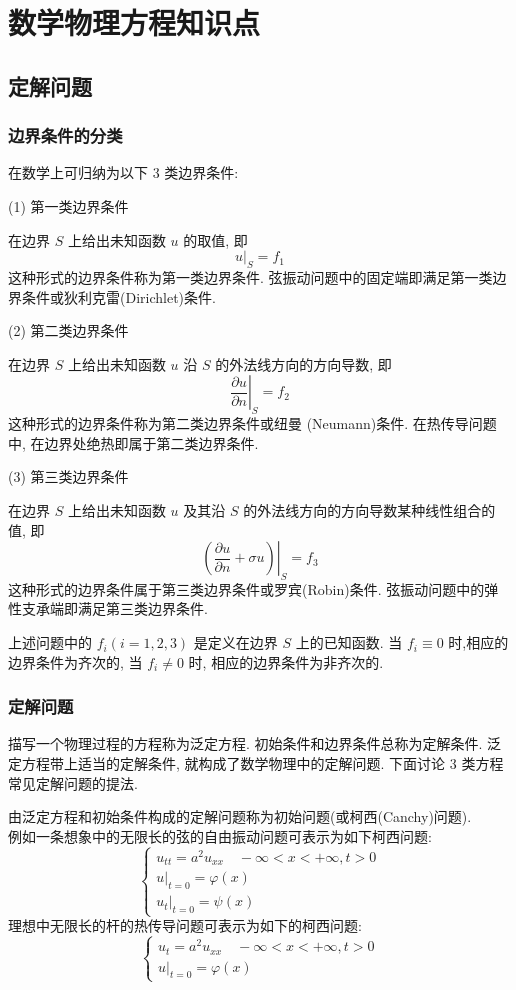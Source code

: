 \section{数学物理方程知识点}

\subsection{定解问题}

\subsubsection{边界条件的分类}
在数学上可归纳为以下 3 类边界条件:

(1) 第一类边界条件

在边界 $S$ 上给出未知函数 $ u $ 的取值, 即
$$
\left.u\right|_{S}=f_{1}
$$
这种形式的边界条件称为第一类边界条件. 弦振动问题中的固定端即满足第一类边界条件或狄利克雷(Dirichlet)条件.

(2) 第二类边界条件

在边界 $ S $ 上给出未知函数 $ u $ 沿 $ S $ 的外法线方向的方向导数, 即
$$
\left.\frac{\partial u}{\partial n}\right|_{S}=f_{2}
$$
这种形式的边界条件称为第二类边界条件或纽曼 (Neumann)条件. 在热传导问题中, 在边界处绝热即属于第二类边界条件.

(3) 第三类边界条件

在边界 $S$ 上给出未知函数 $u$ 及其沿 $S$ 的外法线方向的方向导数某种线性组合的值, 即
$$
\left.\left(\frac{\partial u}{\partial n}+\sigma u\right)\right|_{S}=f_{3}
$$
这种形式的边界条件属于第三类边界条件或罗宾(Robin)条件. 弦振动问题中的弹性支承端即满足第三类边界条件.

上述问题中的 $ f_{i}(i=1,2,3) $ 是定义在边界 $ S $ 上的已知函数. 当 $ f_{i} \equiv 0 $ 时,相应的边界条件为齐次的, 当 $ f_{i} \neq 0 $ 时, 相应的边界条件为非齐次的.

\subsubsection{定解问题}

描写一个物理过程的方程称为泛定方程. 初始条件和边界条件总称为定解条件. 泛定方程带上适当的定解条件, 就构成了数学物理中的定解问题. 下面讨论 3 类方程常见定解问题的提法.

由泛定方程和初始条件构成的定解问题称为初始问题(或柯西(Canchy)问题).\\
例如一条想象中的无限长的弦的自由振动问题可表示为如下柯西问题:
$$
\left\{\begin{array}{l}
u_{t t}=a^{2} u_{x x} \quad-\infty < x < +\infty, t >0 \\
\left.u\right|_{t=0}=\varphi(x) \\
\left.u_{t}\right|_{t=0}=\psi(x)
\end{array}\right.
$$
理想中无限长的杆的热传导问题可表示为如下的柯西问题:
$$
\left\{\begin{array}{l}
u_{t}=a^{2} u_{x x} \quad-\infty< x < +\infty, t>0 \\
\left.u\right|_{t=0}=\varphi(x)
\end{array}\right.
$$

